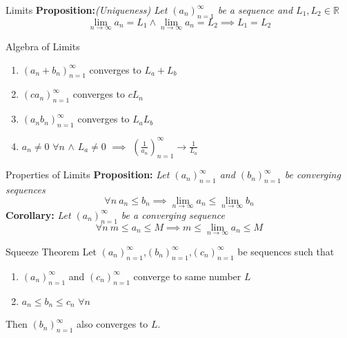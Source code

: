 \documentclass{article}
\begin{document}
\begin{multicols*}{3}
\begin{blackbox}{Limits}
    \textbf{Proposition:}\textit{(Uniqueness) Let $(a_n)_{n=1}^\infty$ be a sequence and $L_1, L_2 \in \mathbb{R}$}\\[-3ex]
    \[\lim_{n\rightarrow\infty}a_n = L_1 \wedge \lim_{n\rightarrow\infty} a_n = L_2 \implies L_1 = L_2\]
    \begin{bluebox}{Algebra of Limits}
   \begin{enumerate}[label=(\roman*)]
       \item $(a_n + b_n)_{n=1}^\infty$ converges to $L_a + L_b$
       \item $(ca_n)_{n=1}^\infty$ converges to $cL_n$
       \item $(a_nb_n)_{n=1}^\infty$ converges to $L_aL_b$
       \item $a_n \neq 0$ $\forall n$ $\wedge$ $L_a \neq 0$ $\implies$ $\left(\frac{1}{a_n}\right)_{n=1}^\infty \rightarrow \frac{1}{L_a}$
   \end{enumerate}
\end{bluebox}
 \begin{pinkbox}{Properties of Limits}
        \textbf{Proposition:} \textit{Let $(a_n)_{n=1}^\infty$ and $(b_n)_{n=1}^\infty$ be converging sequences}\\[-1.6ex]
        \[\forall n \ a_n \leq b_n \implies \lim_{n\rightarrow \infty} a_n  \leq \lim_{n \rightarrow \infty} b_n\]
        \textbf{Corollary:} \textit{Let $(a_n)_{n=1}^\infty$ be a converging sequence}\\[-1.6ex]
        \[\forall n \ m \leq a_n \leq M \implies m \leq \lim_{n\rightarrow \infty} a_n \leq M\]
    \end{pinkbox}
    \begin{brownbox}{Squeeze Theorem}
    Let $(a_n)_{n=1}^\infty$,$(b_n)_{n=1}^\infty$,$(c_n)_{n=1}^\infty$ be sequences such that 
    \begin{enumerate}[label=(\roman*)]
        \item $(a_n)_{n=1}^\infty$ and $(c_n)_{n=1}^\infty$ converge to same number $L$
        \item $a_n \leq b_n \leq c_n$ $\forall n$
    \end{enumerate}
    Then $(b_n)_{n=1}^\infty$ also converges to $L$.
    \end{brownbox}


\end{blackbox}
\end{multicols*}
\end{document}
